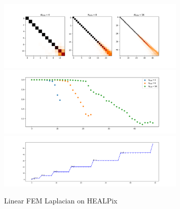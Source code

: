 \begin{figure}[h]
	\label{fig:FEMHealpix}
	\caption{Linear FEM Laplacian on HEALPix}
	\centering
	\includegraphics[width=0.8\textwidth]{../codes/03.FEM_laplacian/HEALPix/img/linearFEM.png}
	\includegraphics[width=0.8\textwidth]{../codes/03.FEM_laplacian/HEALPix/img/linearFEM_diagonal.png}	
	\includegraphics[width=0.8\textwidth]{../codes/03.FEM_laplacian/HEALPix/img/FEM_eigenvalues_16.png}	 
\end{figure}

